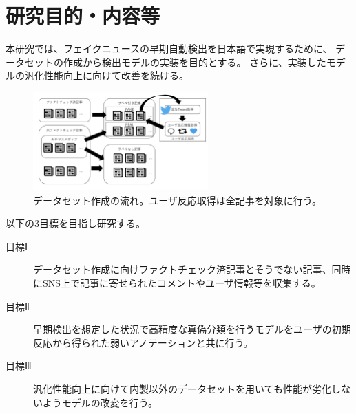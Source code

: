 
\section{研究目的・内容等}

\vspace{20pt}
本研究では、フェイクニュースの早期自動検出を日本語で実現するために、
データセットの作成から検出モデルの実装を目的とする。
さらに、実装したモデルの汎化性能向上に向けて改善を続ける。


\setlength\intextsep{0pt}
\setlength\textfloatsep{0pt}
\begin{figure}
    \vspace{-5mm}
    \centering
    \includegraphics[width=0.6\textwidth]{figs/dataset.pdf}
    \vspace{-1cm} 
    \caption{データセット作成の流れ。ユーザ反応取得は全記事を対象に行う。}
    \label{fig:dataset}
\end{figure}

以下の3目標を目指し研究する。
\begin{description}
    \item[目標Ⅰ] データセット作成に向けファクトチェック済記事とそうでない記事、同時にSNS上で記事に寄せられたコメントやユーザ情報等を収集する。
    \item[目標Ⅱ] 早期検出を想定した状況で高精度な真偽分類を行うモデルをユーザの初期反応から得られた弱いアノテーションと共に行う。
    \item[目標Ⅲ] 汎化性能向上に向けて内製以外のデータセットを用いても性能が劣化しないようモデルの改変を行う。
\end{description}

